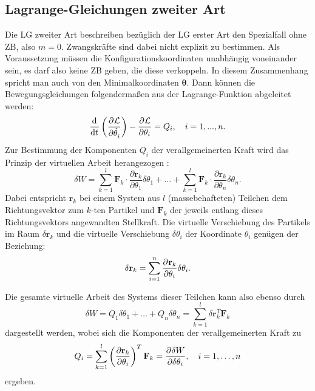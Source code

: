 \subsection{Lagrange-Gleichungen zweiter Art}
\label{sec:Lagrange2_theory}
Die LG zweiter Art beschreiben bezüglich der LG erster Art den Spezialfall ohne ZB, also $m = 0$. Zwangskräfte sind dabei nicht explizit zu bestimmen. Als Voraussetzung müssen die Konfigurationskoordinaten unabhängig voneinander sein, es darf also keine ZB geben, die diese verkoppeln. In diesem Zusammenhang spricht man auch von den Minimalkoordinaten $\boldsymbol{\theta}$. Dann können die Bewegungsgleichungen folgendermaßen aus der Lagrange-Funktion abgeleitet werden:
\begin{equation}
	\label{eq:lagrange2}
	\frac{\mathrm{d}^{}}{\mathrm{d}{t}^{}}\left(\frac{\partial^{}\mathcal{L}}{\partial{\dot{\theta}_i}^{}} \right) - \frac{\partial^{}\mathcal{L}}{\partial{\theta_i}^{}} = Q_i, \quad i = 1, ..., n.
\end{equation}
Zur Bestimmung der Komponenten $Q_i$ der verallgemeinerten Kraft wird das Prinzip der virtuellen Arbeit herangezogen \cite{VirtualWork}:
\begin{equation}
	\delta W = \sum_{k=1}^l \mathbf{F}_k \cdot \frac{\partial \mathbf{r}_k}{\partial \theta_1} \delta \theta_1 +\ldots + \sum_{k=1}^l \mathbf{F}_k \cdot \frac{\partial \mathbf{r}_k}{\partial \theta_n} \delta \theta_n.
\end{equation}
Dabei entspricht $\mathbf{r}_k$ bei einem System aus $l$ (massebehafteten) Teilchen dem Richtungsvektor zum $k$-ten Partikel und $\mathbf{F}_k$ der jeweils entlang dieses Richtungsvektors angewandten Stellkraft. Die virtuelle Verschiebung des Partikels im Raum $\delta \mathbf{r}_{k}$ und die virtuelle Verschiebung $\delta \theta_{i}$ der Koordinate $\theta_i$ genügen der Beziehung:
\begin{equation}
	\delta \mathbf{r}_{k} = \sum_{i = 1}^{n} \frac{\partial^{}\mathbf{r}_{k}}{\partial{\theta_i}^{}} \delta \theta_i .
\end{equation}

Die gesamte virtuelle Arbeit des Systems dieser Teilchen kann also ebenso durch
\begin{equation}
\label{eq:virtual_work}
\delta W = Q_1 \delta \theta_1 + \ldots + Q_n\delta \theta_n = \sum_{k=1}^{l}\delta \mathbf{r}_k^T \mathbf{F}_k
\end{equation}
dargestellt werden, wobei sich die Komponenten der verallgemeinerten Kraft zu
\begin{equation}
\label{eq:virtual_work_force}
Q_i = \sum_{k=1}^l \left(\frac {\partial \mathbf{r}_k} {\partial \theta_i} \right)^T \mathbf{F}_{k} = \frac{\partial^{}\delta W}{\partial{\delta \theta_i}^{}} ,\quad i=1,\ldots, n 
\end{equation}
ergeben.
